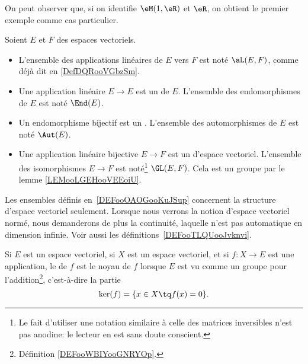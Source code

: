 On peut observer que, si on identifie $\eM(1, \eR)$ et $\eR$, on obtient le premier exemple comme cas particulier.

\begin{definition}      \label{DEFooOAOGooKuJSup}
	Soient \( E\) et \( F\) des espaces vectoriels.
	\begin{itemize}
		\item
		      L'ensemble des applications linéaires de \( E\) vers \( F\) est noté $\aL(E,F)$, comme déjà dit en \ref{DefDQRooVGbzSm}.
		\item Une application linéaire \( E\to E\) est un  de \( E\). L'ensemble des endomorphismes de \( E\) est noté \( \End(E)\).
		\item Un endomorphisme bijectif est un . L'ensemble des automorphismes de \( E\) est noté \( \Aut(E)\).
		\item
		      Une application linéaire bijective \( E\to F\) est un  d'espace vectoriel. L'ensemble des isomorphismes \( E\to F\) est noté\footnote{Le fait d'utiliser une notation similaire à celle des matrices inversibles n'est pas anodine: le lecteur en est sans doute conscient.} \( \GL(E,F)\). Cela est un groupe par le lemme \ref{LEMooLGEHooVEEoiU}.
	\end{itemize}
\end{definition}

\begin{remark}
	Les ensembles définis en~\ref{DEFooOAOGooKuJSup} concernent la structure d'espace vectoriel seulement. Lorsque nous verrons la notion d'espace vectoriel normé, nous demanderons de plus la continuité, laquelle n'est pas automatique en dimension infinie. Voir aussi les définitions~\ref{DEFooTLQUooJvknvi}.
\end{remark}

\begin{definition}
	Si \( E\) est un espace vectoriel, si \( X\) est un espace vectoriel, et si \( f\colon X\to E\) est une application, le  de \( f\) est le noyau de \( f\) lorsque \( E\) est vu comme un groupe pour l'addition\footnote{Définition \ref{DEFooWBIYooGNRYOp}.}, c'est-à-dire la partie
	\begin{equation}
		\ker(f)=\{ x\in X\tq f(x)=0 \}.
	\end{equation}
\end{definition}

